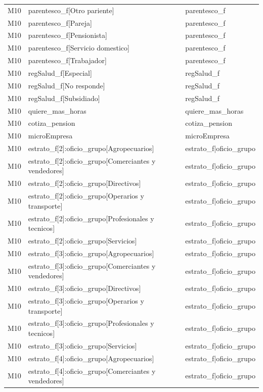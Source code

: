 \begin{longtable}{lll}
M10 & parentesco\_f[Otro pariente] & parentesco\_f \\
M10 & parentesco\_f[Pareja] & parentesco\_f \\
M10 & parentesco\_f[Pensionista] & parentesco\_f \\
M10 & parentesco\_f[Servicio domestico] & parentesco\_f \\
M10 & parentesco\_f[Trabajador] & parentesco\_f \\
M10 & regSalud\_f[Especial] & regSalud\_f \\
M10 & regSalud\_f[No responde] & regSalud\_f \\
M10 & regSalud\_f[Subsidiado] & regSalud\_f \\
M10 & quiere\_mas\_horas & quiere\_mas\_horas \\
M10 & cotiza\_pension & cotiza\_pension \\
M10 & microEmpresa & microEmpresa \\
M10 & estrato\_f[2]:oficio\_grupo[Agropecuarios] & estrato\_f|oficio\_grupo \\
M10 & estrato\_f[2]:oficio\_grupo[Comerciantes y vendedores] & estrato\_f|oficio\_grupo \\
M10 & estrato\_f[2]:oficio\_grupo[Directivos] & estrato\_f|oficio\_grupo \\
M10 & estrato\_f[2]:oficio\_grupo[Operarios y transporte] & estrato\_f|oficio\_grupo \\
M10 & estrato\_f[2]:oficio\_grupo[Profesionales y tecnicos] & estrato\_f|oficio\_grupo \\
M10 & estrato\_f[2]:oficio\_grupo[Servicios] & estrato\_f|oficio\_grupo \\
M10 & estrato\_f[3]:oficio\_grupo[Agropecuarios] & estrato\_f|oficio\_grupo \\
M10 & estrato\_f[3]:oficio\_grupo[Comerciantes y vendedores] & estrato\_f|oficio\_grupo \\
M10 & estrato\_f[3]:oficio\_grupo[Directivos] & estrato\_f|oficio\_grupo \\
M10 & estrato\_f[3]:oficio\_grupo[Operarios y transporte] & estrato\_f|oficio\_grupo \\
M10 & estrato\_f[3]:oficio\_grupo[Profesionales y tecnicos] & estrato\_f|oficio\_grupo \\
M10 & estrato\_f[3]:oficio\_grupo[Servicios] & estrato\_f|oficio\_grupo \\
M10 & estrato\_f[4]:oficio\_grupo[Agropecuarios] & estrato\_f|oficio\_grupo \\
M10 & estrato\_f[4]:oficio\_grupo[Comerciantes y vendedores] & estrato\_f|oficio\_grupo \\

\end{longtable}
